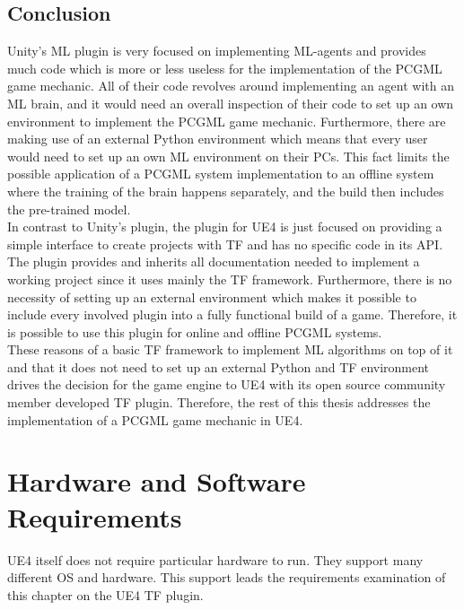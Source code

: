\documentclass[MGS,Master,english]{twbook}%
\begin{document}
\subsection{Conclusion}
Unity’s ML plugin is very focused on implementing ML-agents and provides much code which is more or less useless for the implementation of the PCGML game mechanic. All of their code revolves around implementing an agent with an ML brain, and it would need an overall inspection of their code to set up an own environment to implement the PCGML game mechanic. Furthermore, there are making use of an external Python environment which means that every user would need to set up an own ML environment on their PCs. This fact limits the possible application of a PCGML system implementation to an offline system where the training of the brain happens separately, and the build then includes the pre-trained model.\\
In contrast to Unity’s plugin, the plugin for UE4 is just focused on providing a simple interface to create projects with \ac{TF} and has no specific code in its API. The plugin provides and inherits all documentation needed to implement a working project since it uses mainly the \ac{TF} framework. Furthermore, there is no necessity of setting up an external environment which makes it possible to include every involved plugin into a fully functional build of a game. Therefore, it is possible to use this plugin for online and offline PCGML systems.\\
These reasons of a basic \ac{TF} framework to implement ML algorithms on top of it and that it does not need to set up an external Python and \ac{TF} environment drives the decision for the game engine to UE4 with its open source community member developed \ac{TF} plugin. Therefore, the rest of this thesis addresses the implementation of a PCGML game mechanic in UE4.

\section{Hardware and Software Requirements}
UE4 itself does not require particular hardware to run. They support many different OS and hardware. This support leads the requirements examination of this chapter on the UE4 \ac{TF} plugin.
\end{document}
